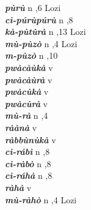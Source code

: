 \begin{multicols}{2}
{{\bfseries\itshape pùrù}} \relax  n  ,6  \relax  Lozi \relax  \\
{{\bfseries\itshape cì-púrùpúrù}} \relax  n  ,8  \relax   \relax  \\
{{\bfseries\itshape kà-pùtùrà}} \relax  n  ,13  \relax  Lozi \relax  \\
{{\bfseries\itshape mù-pùzò}} \relax  n  ,4  \relax  Lozi \relax  \\
{{\bfseries\itshape m-pùzò}} \relax  n  ,10 \relax  {} \relax   \relax  \\
{{\bfseries\itshape pwàcàùkà}} \relax  v  \relax   \relax  {} \relax   \relax  \\
{{\bfseries\itshape pwàcàùrà}} \relax  v  \relax  {} \relax   \relax  \\
{{\bfseries\itshape pwàcùkà}} \relax  v  \relax  {} \relax   \relax  \\
{{\bfseries\itshape pwàcùrà}} \relax  v  \relax   \relax  {} \relax   \relax  \\
{{\bfseries\itshape mù-rà}} \relax  n  ,4  \relax   \relax  \\
{{\bfseries\itshape ràànà}} \relax  v  \relax   \relax  {} \relax   \relax  \\
{{\bfseries\itshape ràbbùnùkà}} \relax  v  \relax   \relax  {} \relax   \relax  \\
{{\bfseries\itshape cì-rábì}} \relax  n  ,8  \relax   \relax  \\
{{\bfseries\itshape cì-ràbò}} \relax  n  ,8  \relax   \relax  \\
{{\bfseries\itshape cì-ráhà}} \relax  n  ,8  \relax   \relax  \\
{{\bfseries\itshape ràhà}} \relax  v  \relax   \relax  {} \relax   \relax  \\
{{\bfseries\itshape mù-ràhò}} \relax  n  ,4  \relax  Lozi \relax  \\

\end{multicols}
